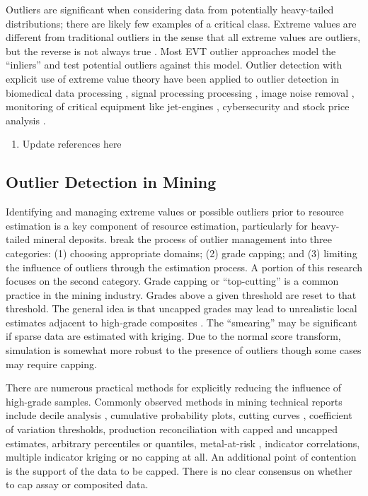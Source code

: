 Outliers are significant when considering data from potentially heavy-tailed distributions; there are likely few examples of a critical class. Extreme values are different from traditional outliers in the sense that all extreme values are outliers, but the reverse is not always true \citep{aggarwal2016outlier}. Most EVT outlier approaches model the ``inliers'' and test potential outliers against this model. Outlier detection with explicit use of extreme value theory have been applied to outlier detection in biomedical data processing \citep{roberts2000extreme}, signal processing processing \citep{hazan2012extreme}, image noise removal \citep{roberts1999novelty}, monitoring of critical equipment like jet-engines \citep{clifton2014extending}, cybersecurity and stock price analysis \citep{siffer2017anomaly}.

\begin{enumerate}
    \item Update references here
\end{enumerate}

\FloatBarrier
\subsection{Outlier Detection in Mining}
\label{subsec:01miningoutlier}

Identifying and managing extreme values or possible outliers prior to resource estimation is a key component of resource estimation, particularly for heavy-tailed mineral deposits. \cite{leuangthong2015dealing} break the process of outlier management into three categories: (1) choosing appropriate domains; (2) grade capping; and (3) limiting the influence of outliers through the estimation process. A portion of this research focuses on the second category. Grade capping or ``top-cutting'' is a common practice in the mining industry. Grades above a given threshold are reset to that threshold. The general idea is that uncapped grades may lead to unrealistic local estimates adjacent to high-grade composites \citep{nowak2013suggestions}. The ``smearing'' may be significant if sparse data are estimated with kriging. Due to the normal score transform, simulation is somewhat more robust to the presence of outliers though some cases may require capping.

There are numerous practical methods for explicitly reducing the influence of high-grade samples. Commonly observed methods in mining technical reports include decile analysis \citep{parrish1997geologist}, cumulative probability plots, cutting curves \citep{roscoe1996cutting}, coefficient of variation thresholds, production reconciliation with capped and uncapped estimates, arbitrary percentiles or quantiles, metal-at-risk \citep{parker2006}, indicator correlations, multiple indicator kriging or no capping at all. An additional point of contention is the support of the data to be capped. There is no clear consensus on whether to cap assay or composited data.

